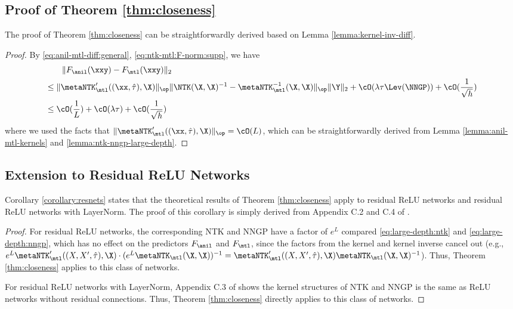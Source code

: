 \documentclass{article}
\begin{document}
\subsection{Proof of Theorem \ref{thm:closeness}}\label{supp:proof:main-theorem}



The proof of Theorem \ref{thm:closeness} can be straightforwardly derived based on Lemma \ref{lemma:kernel-inv-diff}.
\begin{proof}
By \eqref{eq:anil-mtl-diff:general}, \eqref{eq:ntk-mtl:F-norm:supp}, we have
\begin{align*}
    &\qquad \|F_\anil(\xxy) - F_\mtl(\xxy)\|_2 \\
    &\leq \|\metaNTK_\mtl'((\xx,\hat\tau),\X)\|_\op \|\NTK(\X,\X)^{-1} - \metaNTK_\mtl^{-1}(\X,\X)\|_\op \|\Y\|_2 + \cO(\lambda \tau \Lev(\NNGP)) +\cO(\frac{1}{\sqrt h})\\
    &\leq \cO(\frac{1}{L}) + \cO(\lambda \tau) +\cO(\frac{1}{\sqrt h})
\end{align*}
where we used the facts that $\|\metaNTK_\mtl'((\xx,\hat\tau),\X)\|_\op = 
\cO(L)$, which can be straightforwardly derived from Lemma \ref{lemma:anil-mtl-kernels} and \ref{lemma:ntk-nngp-large-depth}.
\end{proof}






\subsection{Extension to Residual ReLU Networks}\label{supp:proof:residual}

Corollary \ref{corollary:resnets} states that the theoretical results of Theorem \ref{thm:closeness} apply to residual ReLU networks and residual ReLU networks with LayerNorm. The proof of this corollary is simply derived from Appendix C.2 and C.4 of \citet{xiao2020dis}. 
\begin{proof}
For residual ReLU networks, the corresponding NTK and NNGP have a factor of $e^{L}$ compared \eqref{eq:large-depth:ntk} and \eqref{eq:large-depth:nngp}, which has no effect on the predictors $F_\anil$ and $F_\mtl$, since the factors from the kernel and kernel inverse cancel out (e.g., $e^{L}\metaNTK_\mtl'((X,X',\hat\tau),\X) \cdot (e^{L} \metaNTK_\mtl(\X,\X))^{-1} = \metaNTK_\mtl'((X,X',\hat\tau),\X)  \metaNTK_\mtl(\X,\X)^{-1}$). Thus, Theorem \ref{thm:closeness} applies to this class of networks.

For residual ReLU networks with LayerNorm, Appendix C.3 of \citet{xiao2020dis} shows the kernel structures of NTK and NNGP is the same as ReLU networks without residual connections. Thus, Theorem \ref{thm:closeness} directly applies to this class of networks.
\end{proof}
\end{document}
